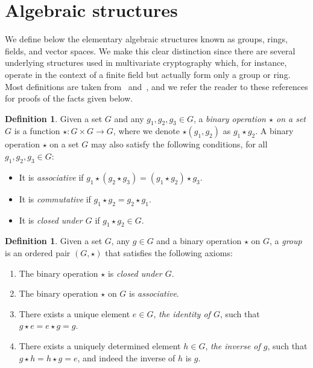\documentclass[12pt, a4paper, oneside]{memoir}
\theoremstyle{definition}
\newtheorem{definition}[theorem]{Definition}
\begin{document}
\section{Algebraic structures}\label{sec:algebra}

We define below the elementary algebraic structures known as groups, rings, fields, and vector spaces. We make this clear distinction since there are several underlying structures used in multivariate cryptography which, for instance, operate in the context of a finite field but actually form only a group or ring. Most definitions are taken from~\cite{Dummit:2003} and~\cite{Mullen:2013}, and we refer the reader to these references for proofs of the facts given below.

\begin{definition}
  Given a set $G$ and any $g_{1}, g_{2}, g_{3} \in G$, a \emph{binary operation $\star$ on a set $G$} is a function $\star : G \times G \to G$, where we denote $\star(g_{1}, g_{2})$ as $g_{1} \star g_{2}$. A binary operation $\star$ on a set $G$ may also satisfy the following conditions, for all $g_{1}, g_{2}, g_{3} \in G$:
  
  \begin{itemize}
    \item It is \emph{associative} if $g_{1} \star (g_{2} \star g_{3}) = (g_{1} \star g_{2}) \star g_{3}$.
    \item It is \emph{commutative} if $g_{1} \star g_{2} = g_{2} \star g_{1}$.
    \item It is \emph{closed under $G$} if $g_{1} \star g_{2} \in G$.
  \end{itemize}
\end{definition}

\begin{definition}
  Given a set $G$, any $g \in G$ and a binary operation $\star$ on $G$, a \emph{group} is an ordered pair $(G, \star)$ that satisfies the following axioms:
  
  \begin{enumerate}
    \item The binary operation $\star$ is \emph{closed under $G$}.
    \item The binary operation $\star$ on $G$ is \emph{associative}.
    \item There exists a unique element $e \in G$, \emph{the identity of $G$}, such that $g \star e = e \star g = g$.
    \item There exists a uniquely determined element $h \in G$, \emph{the inverse of $g$}, such that $g \star h = h \star g = e$, and indeed the inverse of $h$ is $g$.
  \end{enumerate}
\end{definition}
\end{document}
